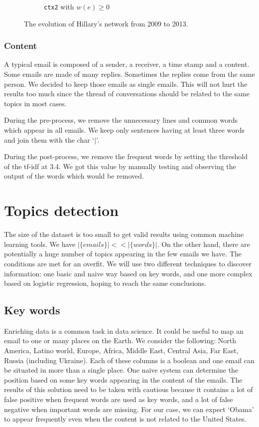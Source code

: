 \documentclass[11pt]{article}
\begin{document}
\begin{figure}[!t]
\begin{subfigure}[b]{0.3\linewidth}
		\caption[]%
		{{\small \texttt{ctx2} with $w(e) \geq 0$}}
		\label{fig:network_ctx2}
	\end{subfigure}
	\caption{The evolution of Hillary's network from 2009 to 2013.}
	\label{fig:network_evolution}
\end{figure}

\subsubsection{Content}

A typical email is composed of a sender, a receiver, a time stamp and a content. Some emails are made of many replies. Sometimes the replies come from the same person. We decided to keep those emails as single emails. This will not hurt the results too much since the thread of conversations should be related to the same topics in most cases.

During the pre-process, we remove the unnecessary lines and common words which appear in all emails. We keep only sentences having at least three words and join them with the char `$|$'.

During the post-process, we remove the frequent words by setting the threshold of the tf-idf at 3.4. We got this value by manually testing and observing the output of the words which would be removed.

\section{Topics detection}
\label{sec:topics_detection}

The size of the dataset is too small to get valid results using common machine learning tools. We have $|\{ emails \}| << |\{ words \}|$. On the other hand, there are potentially a huge number of topics appearing in the few emails we have. The conditions are met for an overfit. We will use two different techniques to discover information: one basic and naive way based on key words, and one more complex based on logistic regression, hoping to reach the same conclusions.

\subsection{Key words}

Enriching data is a common task in data science. It could be useful to map an email to one or many places on the Earth. We consider the following: North America, Latino world, Europe, Africa, Middle East, Central Asia, Far East, Russia (including Ukraine). Each of these columns is a boolean and one email can be situated in more than a single place. One naive system can determine the position based on some key words appearing in the content of the emails. The results of this solution need to be taken with cautious because it contains a lot of false positive when frequent words are used as key words, and a lot of false negative when important words are missing. For our case, we can expect `Obama' to appear frequently even when the content is not related to the United States.
\end{document}
